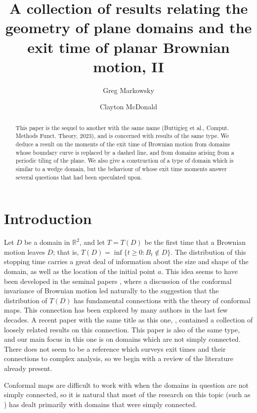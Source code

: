 \documentclass[a4paper, oneside, 12pt]{amsart}
\title[Collection of results on exit time of Brownian motion]{A collection of results relating the geometry of plane domains and the exit time of planar Brownian motion, II}
\author{Greg Markowsky}
\author{Clayton McDonald}
\newcommand{\RR}{\mathbb{R}}
\begin{document}
 \begin{abstract}
This paper is the sequel to another with the same name (Buttigieg et al., Comput. Methods Funct. Theory, 2023), and is concerned with results of the same type. We deduce a result on the moments of the exit time of Brownian motion from domains whose boundary curve is replaced by a dashed line, and from domains arising from a periodic tiling of the plane. We also give a construction of a type of domain which is similar to a wedge domain, but the behaviour of whose exit time moments answer several questions that had been speculated upon.
 \end{abstract}
\maketitle

\def\changemargin#1#2{\list{}{\rightmargin#2\leftmargin#1}\item[]}
\let\endchangemargin=\endlist

\section{Introduction} \label{intro}

Let $D$ be a domain in $\RR^2$, and let $T=T(D)$ be the first time that a Brownian motion
leaves $D$; that is, $T(D) = \inf\{t\geq 0: B_t \notin D\}$. The distribution of
this stopping time carries a great deal of information about the size and shape
of the domain, as well as the location of the initial point $a$. This idea
seems to have been developed in the seminal papers \cite{burk, davis}, where a
discussion of the conformal invariance of Brownian motion led naturally to the
suggestion that the distribution of $T(D)$ has fundamental connections with the
theory of conformal maps. This connection has been explored by many authors in the last few decades. A recent paper with the same title as this one, \cite{boudbuttme}, contained a collection of loosely related results on this connection. This paper is also of the same type, and our main focus in this one is on domains which are not simply connected. There does not seem to be a reference which surveys exit times and their connections to complex analysis, so we begin with a review of the literature already present. 

Conformal maps are difficult to work with when the
domains in question are not simply connected, so it is natural that most of the
research on this topic (such as \cite{banuelos1993conditioned,
banuelos2024conjecture, banuelos2001first, banuelosdrum, banuelos2005sharp,
dimitri, mecomb, usexitmax, mejmaa, carroll2001old, carroll2006brownian, mac,
meecp, coffee, karafyllia2021property}) has dealt primarily with
domains that were simply connected. 
\end{document}
